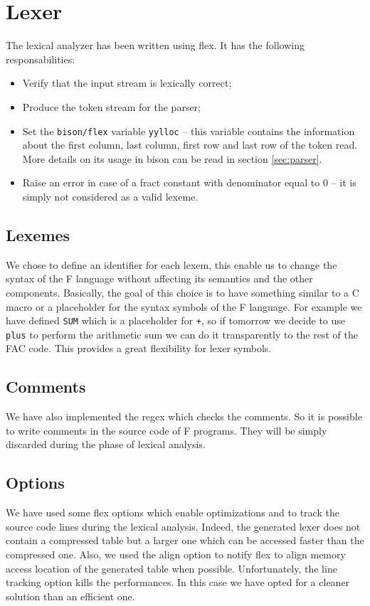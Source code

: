 \section{Lexer}
The lexical analyzer has been written using flex.
It has the following responsabilities:
\begin{itemize}
\item Verify that the input stream is lexically correct;
\item Produce the token stream for the parser;
\item Set the \verb|bison/flex| variable \verb|yylloc| -- this
variable contains the information about the first column, last column,
first row and last row of the token read. More details on its usage in
bison can be read in section \ref{sec:parser}.
\item Raise an error in case of a fract constant with denominator equal
to $0$ -- it is simply not considered as a valid lexeme.
\end{itemize}

\subsection{Lexemes}
We chose to define an identifier for each lexem, this enable us to change the
syntax of the F language without affecting its semantics and the other
components. Basically, the goal of this choice is to have something similar to
a C macro or a placeholder for the syntax symbols of the F language.
For example we have defined \verb|SUM| which is a placeholder for \verb|+|, so
if tomorrow we decide to use \verb|plus| to perform the arithmetic sum we can do
it transparently to the rest of the FAC code. This provides a great flexibility
for lexer symbols.

\subsection{Comments}
We have also implemented the regex which checks the comments. So it is possible
to write comments in the source code of F programs. They will be simply 
discarded during the phase of lexical analysis.

\subsection{Options}
We have used some flex options which enable optimizations
and to track the source code lines during the lexical analysis. Indeed, the
generated lexer does not contain a compressed table but a larger one which can
be accessed faster than the compressed one. Also, we used the align option to
notify flex to align memory access location of the generated table when
possible. Unfortunately, the line tracking option kills the performances.
In this case we have opted for a cleaner solution than an efficient one.

